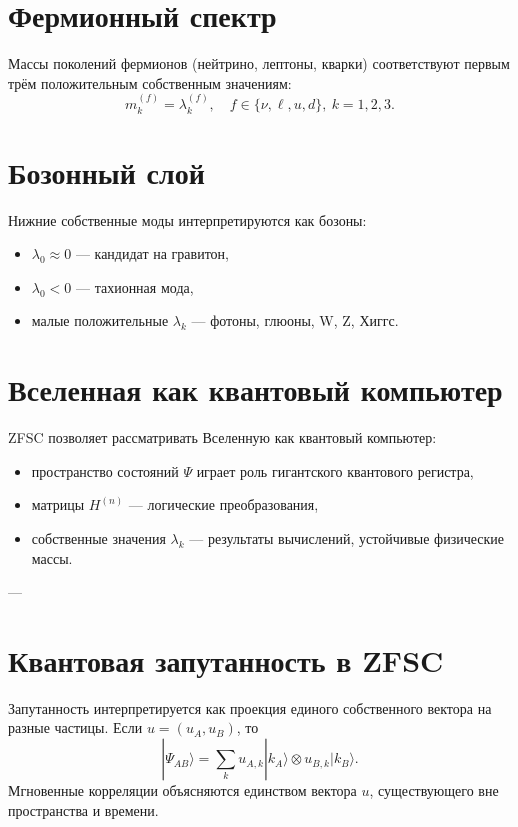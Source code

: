 \documentclass[12pt,a4paper]{article}
\begin{document}
\section{Фермионный спектр}
Массы поколений фермионов (нейтрино, лептоны, кварки) соответствуют первым трём положительным собственным значениям:
\[
m^{(f)}_k = \lambda^{(f)}_k, \quad f \in \{\nu, \ell, u, d\}, \ k=1,2,3.
\]

\section{Бозонный слой}
Нижние собственные моды интерпретируются как бозоны:
\begin{itemize}
  \item $\lambda_0 \approx 0$ --- кандидат на гравитон,
  \item $\lambda_0 < 0$ --- тахионная мода,
  \item малые положительные $\lambda_k$ --- фотоны, глюоны, W, Z, Хиггс.
\end{itemize}

\section{Вселенная как квантовый компьютер}
ZFSC позволяет рассматривать Вселенную как квантовый компьютер:  
\begin{itemize}
  \item пространство состояний $\Psi$ играет роль гигантского квантового регистра,
  \item матрицы $H^{(n)}$ --- логические преобразования,
  \item собственные значения $\lambda_k$ --- результаты вычислений, устойчивые физические массы.
\end{itemize}

---

\section{Квантовая запутанность в ZFSC}
Запутанность интерпретируется как проекция единого собственного вектора на разные частицы.  
Если $u = (u_A, u_B)$, то
\[
|\Psi_{AB}\rangle = \sum_k u_{A,k} |k_A\rangle \otimes u_{B,k} |k_B\rangle.
\]
Мгновенные корреляции объясняются единством вектора $u$, существующего вне пространства и времени.
\end{document}
